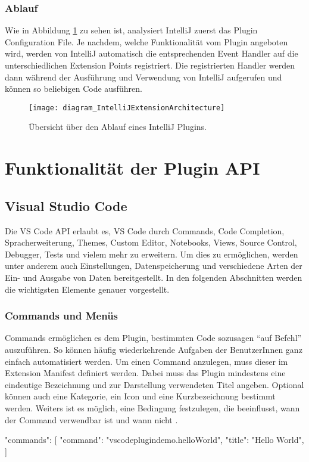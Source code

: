 \subsubsection{Ablauf}
  Wie in Abbildung \ref{fig:diagram_IntelliJExtensionArchitecture} zu sehen ist,
  analysiert IntelliJ zuerst das Plugin Configuration File.
  Je nachdem, welche Funktionalität vom Plugin angeboten wird, werden
  von IntelliJ automatisch die entsprechenden Event Handler 
  auf die unterschiedlichen Extension Points registriert. 
  Die registrierten Handler werden dann während der Ausführung und Verwendung
  von IntelliJ aufgerufen und können so beliebigen Code ausführen.
  \begin{figure}
    \centering
    \texttt{[image: diagram\_IntelliJExtensionArchitecture]}
    \caption{Übersicht über den Ablauf eines IntelliJ Plugins.}
    \label{fig:diagram_IntelliJExtensionArchitecture}
  \end{figure}   

\section{Funktionalität der Plugin API}
\label{sec:FunktionalitätDerPluginAPI}

\subsection{Visual Studio Code}

Die VS Code API erlaubt es, VS Code durch Commands, Code Completion, Spracherweiterung, 
Themes, Custom Editor, Notebooks, Views, Source Control, Debugger, Tests und vielem mehr zu
erweitern. Um dies zu ermöglichen, werden unter anderem auch Einstellungen, Datenspeicherung
und verschiedene Arten der Ein- und Ausgabe von Daten bereitgestellt. In den folgenden Abschnitten
werden die wichtigsten Elemente genauer vorgestellt.

\subsubsection{Commands und Menüs}
  Commands ermöglichen es dem Plugin, bestimmten Code sozusagen \enquote{auf Befehl} auszuführen.
  So können häufig wiederkehrende Aufgaben der BenutzerInnen ganz einfach automatisiert werden.
  Um einen Command anzulegen, muss dieser im Extension Manifest definiert werden. Dabei muss
  das Plugin mindestens eine eindeutige Bezeichnung und zur Darstellung verwendeten Titel angeben.
  Optional können auch eine Kategorie, ein Icon und eine Kurzbezeichnung bestimmt werden. 
  Weiters ist es möglich, eine Bedingung festzulegen, die beeinflusst, wann
  der Command verwendbar ist und wann nicht \cite{VSCodeExtensionAPIContributionPointsCommands}.
\begin{JsCode}
    "commands": [
      {
        "command": "vscodeplugindemo.helloWorld",
        "title": "Hello World",
      }
    ] 
\end{JsCode}

